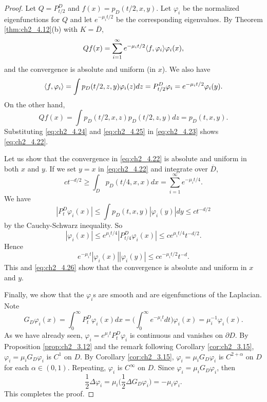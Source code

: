 \begin{proof}
Let $Q = P_{t/2}^D$ and $f(x) = p_D(t/2, x, y)$. Let $\varphi_i$ be the normalized eigenfunctions for $Q$ and let $e^{-\mu_it/2}$ be the corresponding eigenvalues. By Theorem \ref{thm:ch2_4.12}(b) with $K = \overline{D}$,
\begin{equation}\label{eq:ch2_4.23}
    Qf(x) = \sum_{i=1}^{\infty} e^{-\mu_it/2}\langle f, \varphi_i \rangle\varphi_i(x),
\end{equation}
and the convergence is absolute and uniform (in $x$). We also have
\begin{equation}\label{eq:ch2_4.24}
    \langle f, \varphi_i \rangle = \int p_D(t/2, z, y)\varphi_i(z)dz = P_{t/2}^D\varphi_i = e^{-\mu_it/2}\varphi_i(y).
\end{equation}
On the other hand,
\begin{equation}\label{eq:ch2_4.25}
    Qf(x) = \int p_D(t/2, x, z)p_D(t/2, z, y)dz = p_D(t, x, y).
\end{equation}
Substituting \eqref{eq:ch2_4.24} and \eqref{eq:ch2_4.25} in \eqref{eq:ch2_4.23} shows \eqref{eq:ch2_4.22}.

Let us show that the convergence in \eqref{eq:ch2_4.22} is absolute and uniform in both $x$ and $y$. If we set $y = x$ in \eqref{eq:ch2_4.22} and integrate over $\overline{D}$,
\begin{equation}\label{eq:ch2_4.26}
    ct^{-d/2} \geq \int_D p_D(t/4, x, x) dx = \sum_{i=1}^{\infty} e^{-\mu_it/4}.
\end{equation}
We have
\[
    |P_t^D\varphi_i(x)| \leq \int p_D(t, x, y)|\varphi_i(y)| dy \leq ct^{-d/2}
\]
by the Cauchy-Schwarz inequality. So
\begin{equation}\label{eq:ch2_4.27}
    |\varphi_i(x)| \leq e^{\mu_it/4}|P_{t/4}^D\varphi_i(x)| \leq ce^{\mu_it/4}t^{-d/2}.
\end{equation}
Hence
\begin{equation}\label{eq:ch2_4.28}
    e^{-\mu_it}|\varphi_i(x)||\varphi_i(y)| \leq ce^{-\mu_it/2}t^{-d}.
\end{equation}
\mnewpage
This and \eqref{eq:ch2_4.26} show that the convergence is absolute and uniform in $x$ and $y$.

Finally, we show that the $\varphi_i$s are smooth and are eigenfunctions of the Laplacian. Note
\[
    G_D\varphi_i(x) = \int_0^\infty P_t^D\varphi_i(x) dx = \Big(\int_0^\infty e^{-\mu_it} dt\Big)\varphi_i(x) = \mu_i^{-1}\varphi_i(x).
\]
As we have already seen, $\varphi_i = e^{\mu_it}P_t^D\varphi_i$ is continuous and vanishes on $\partial D$. By Proposition \ref{prop:ch2_3.12} and the remark following Corollary \ref{cor:ch2_3.15}, $\varphi_i = \mu_iG_D\varphi_i$ is $C^1$ on $D$. By Corollary \ref{cor:ch2_3.15}, $\varphi_i = \mu_iG_D\varphi_i$ is $C^{2+\alpha}$ on $D$ for each $\alpha \in \allowbreak (0,1)$. Repeating, $\varphi_i$ is $C^\infty$ on $D$. Since $\varphi_i = \mu_iG_D\varphi_i$, then
\[
    \frac{1}{2}\Delta\varphi_i = \mu_i\Big(\frac{1}{2}\Delta G_D\varphi_i\Big) = -\mu_i\varphi_i.
\]
This completes the proof.
\end{proof}

